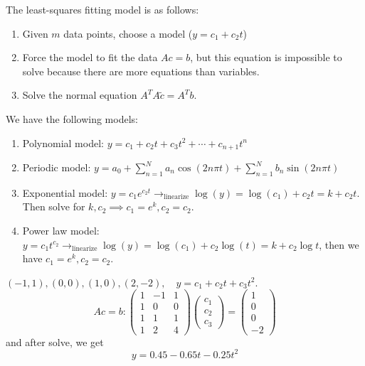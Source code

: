 \documentclass[11pt]{article}
\begin{document}
The least-squares fitting model is as follows:
\begin{enumerate}
    \item Given $m$ data points, choose a model ($y=c_1+c_2t$)
    \item Force the model to fit the data $Ac=b$, but this equation is impossible to solve because there are more equations than variables.
    \item Solve the normal equation $A^TA\tilde{c} = A^Tb$.
\end{enumerate}
\begin{remark}
We have the following models:
\begin{enumerate}
    \item Polynomial model: $y=c_1+c_2t+c_3t^2+\cdots+c_{n+1}t^n$
    \item Periodic model: $y = a_0 + \sum_{n=1}^{N}a_n \cos(2n\pi t)+ \sum_{n=1}^{N}b_n \sin(2n\pi t)$
    \item Exponential model: $y = c_1e^{c_2t} \rightarrow_{\text{linearize}} \log(y) = \log(c_1)+c_2t = k+c_2t$. Then solve for $k, c_2 \implies c_1  = e^k, c_2 = c_2$.
    \item Power law model: $y = c_1t^{c_2} \rightarrow_{\text{linearize}} \log(y) = \log(c_1)+c_2\log(t) = k+c_2\log t$, then we have $c_1 = e^k, c_2=c_2$.
\end{enumerate}


\end{remark}


\begin{example}
    $(-1,1), (0,0), (1,0), (2,-2), \quad y = c_1+c_2t+c_3t^2$.
    \[
        Ac=b:
        \begin{pmatrix}
            1&-1&1\\1&0&0\\1&1&1\\1&2&4
        \end{pmatrix}
        \begin{pmatrix}
            c_1\\c_2\\c_3
        \end{pmatrix}
        =
        \begin{pmatrix}
            1\\0\\0\\-2
        \end{pmatrix}
    \]
    and after solve, we get 
    \[
        y = 0.45-0.65t-0.25t^2
    \]

\end{example}
\end{document}
